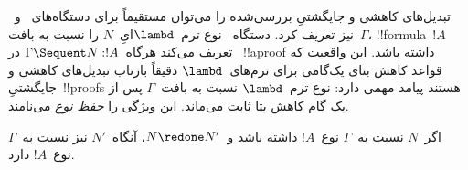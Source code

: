 \documentclass[../../../include/open-logic-section]{subfiles}
\begin{document}


تبدیل‌های کاهشی و جایگشتیِ بررسی‌شده را می‌توان مستقیماً برای
دستگاه‌های~ و~ نیز تعریف کرد. دستگاه~
نوع ترم~$\lambd$ایِ~$N$ را نسبت به بافت~$\Gamma$، !!{formula}~$!A$
تعریف می‌کند هرگاه~$\Gamma \Sequent N : !A$ در~
!!a{proof} داشته باشد. این واقعیت که قواعد کاهش بتای یک‌گامی برای
ترم‌های~$\lambd$ دقیقاً بازتاب تبدیل‌های کاهشی و جایگشتیِ~!!{proof}s
هستند پیامد مهمی دارد: نوع ترم~$\lambd$ نسبت به بافت~$\Gamma$ پس از
یک گام کاهش بتا ثابت می‌ماند. این ویژگی را \emph{حفظ نوع} می‌نامند.

\begin{prop}
اگر~$N$ نسبت به~$\Gamma$ نوع~$!A$ داشته باشد و~$N \redone N'$،
آنگاه~$N'$ نیز نسبت به~$\Gamma$ نوع~$!A$ دارد.
\end{prop}
\end{document}
